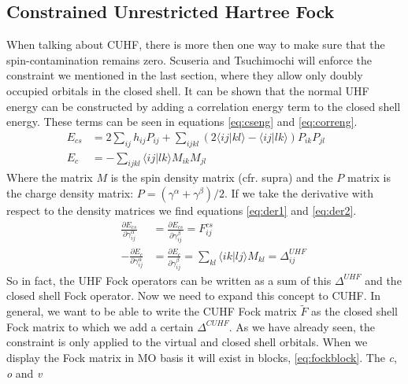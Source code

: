 \documentclass[twoside,twocolumn,9pt]{article}
\begin{document}
\subsection{Constrained Unrestricted Hartree Fock}
When talking about CUHF, there is more then one way to make sure that the spin-contamination remains zero. Scuseria and Tsuchimochi will enforce the constraint we mentioned in the
last section, where they allow only doubly occupied orbitals in the closed shell\cite{Scuseria2010}. It can be shown that the normal UHF energy can be constructed by adding a
correlation energy term to the closed shell energy. These terms can be seen in equations \eqref{eq:cseng} and \eqref{eq:correng}\cite{Savin2010}.
\begin{subequations}
  \begin{align}
    \label{eq:cseng}
    E_{cs} & = 2\sum_{ij}h_{ij}P_{ij} + \sum_{ijkl}(2\langle ij|kl\rangle - \langle ij|lk \rangle)P_{ik}P_{jl} &  & \\
    \label{eq:correng}
    E_c    & = -\sum_{ijkl}\langle ij|lk \rangle M_{ik}M_{jl}                                                  &  &
  \end{align}
\end{subequations}
Where the matrix $M$ is the spin density matrix (cfr. supra) and the $P$ matrix is the charge density matrix: $P = (\gamma^\alpha + \gamma^\beta)/2$. If we take the
derivative with respect to the density matrices we find equations \eqref{eq:der1} and \eqref{eq:der2}.
\begin{subequations}
  \begin{align}
    \label{eq:der1}
     &  & \frac{\partial E_{cs}}{\partial \gamma^\alpha_{ij}} & = \frac{\partial E_{cs}}{\partial \gamma^\beta_{ij}} = F^{cs}_{ij}                                             \\
    \label{eq:der2}
     &  & -\frac{\partial E_c}{\partial \gamma^\alpha_{ij}}   & = \frac{\partial E_c}{\partial \gamma^\beta_{ij}} = \sum_{kl} \langle ik|lj \rangle M_{kl} = \Delta^{UHF}_{ij}
  \end{align}
\end{subequations}
So in fact, the UHF Fock operators can be written as a sum of this $\Delta^{UHF}$ and the closed shell Fock operator. Now we need to expand this concept to CUHF. In general, we want
to be able to write the CUHF Fock matrix $\tilde{F}$ as the closed shell Fock matrix to which we add a certain $\Delta^{CUHF}$. As we have already seen, the constraint is only
applied to the virtual and closed shell orbitals. When we display the Fock matrix in MO basis it will exist in blocks, \eqref{eq:fockblock}. The \textit{c}, \textit{o} and \textit{v}
\end{document}
